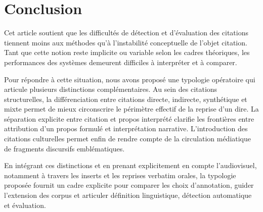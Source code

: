 \documentclass[final,fra]{anthology-ch}         %
\begin{document}
\section{Conclusion}\label{conclusion}

Cet article soutient que les difficultés de détection et d'évaluation
des citations tiennent moins aux méthodes qu'à l'instabilité
conceptuelle de l'objet \og citation\fg{}. Tant que cette notion reste
implicite ou variable selon les cadres théoriques, les performances des
systèmes demeurent difficiles à interpréter et à comparer.

Pour répondre à cette situation, nous avons proposé une typologie
opératoire qui articule plusieurs distinctions complémentaires. Au sein
des citations structurelles, la différenciation entre citations directe,
indirecte, synthétique et mixte permet de mieux circonscrire le
périmètre effectif de la reprise d'un dire. La séparation explicite
entre citation et propos interprété clarifie les frontières entre
attribution d'un propos formulé et interprétation narrative.
L'introduction des citations culturelles permet enfin de rendre compte
de la circulation médiatique de fragments discursifs emblématiques.

En intégrant ces distinctions et en prenant explicitement en compte
l'audiovisuel, notamment à travers les inserts et les reprises verbatim
orales, la typologie proposée fournit un cadre explicite pour comparer
les choix d'annotation, guider l'extension des corpus et articuler
définition linguistique, détection automatique et évaluation.

\printbibliography
\end{document}
